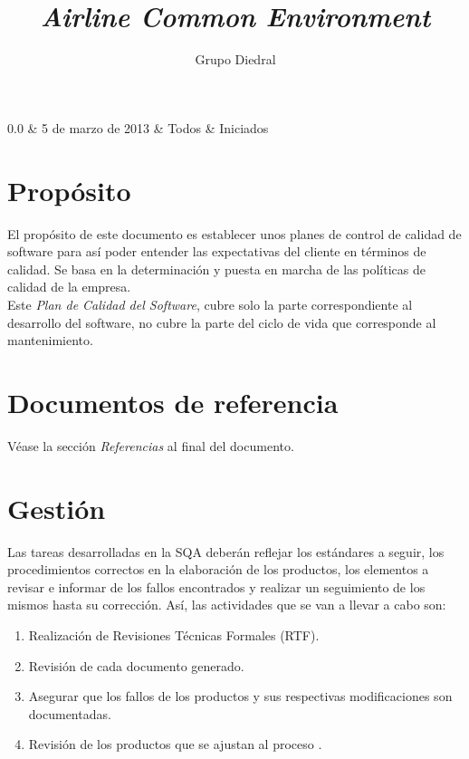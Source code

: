 \documentclass[11pt, a4paper, twoside, titlepage]{article}
\title{\doctitle\\\textsl{Airline Common Environment}}
\author{Grupo Diedral}
\newcommand*{\doctitle}{Plan de calidad}
\newcommand*{\docversion}{3.0}
\begin{document}
	\begin{tablacambios}
		0.0 & 5 de marzo de 2013 & Todos & Iniciados
	\end{tablacambios}


	\portadaace{\doctitle}{\docversion}

	\tableofcontents
	\newpage

	\iniciarnumeraciondiedral
		
	\section{Propósito}	%
		El propósito de este documento es establecer unos planes de control de calidad de software para así poder entender las expectativas del cliente en términos de calidad. Se basa en la determinación y puesta en marcha de las políticas de calidad de la empresa. \\

		Este \textit{Plan de Calidad del Software}, cubre solo la parte correspondiente al desarrollo del software, no cubre la parte del ciclo de vida que corresponde al mantenimiento.
		
	\section{Documentos de referencia}
		\nocite{IEEE730-2002}
		\nocite{IEEE1028-1997}
		\nocite{IEEE1058-1998}
		\nocite{IEEE1012-1998}
		\nocite{PSMAN}

		Véase la sección {\itshape Referencias} al final del documento.

	\section{Gestión} %
		Las tareas desarrolladas en la SQA deberán reflejar los estándares a seguir, los procedimientos correctos en la elaboración de los productos, los elementos a revisar e informar de los fallos encontrados y realizar un seguimiento de los mismos hasta su corrección. Así, las actividades que se van a llevar a cabo son: \\

			\begin{enumerate}
				\item Realización de Revisiones Técnicas Formales (RTF).
				\item Revisión de cada documento generado.
				\item Asegurar que los fallos de los productos y sus respectivas modificaciones son documentadas.
				\item Revisión de los productos que se ajustan al proceso \software.
			\end{enumerate}
\end{document}
